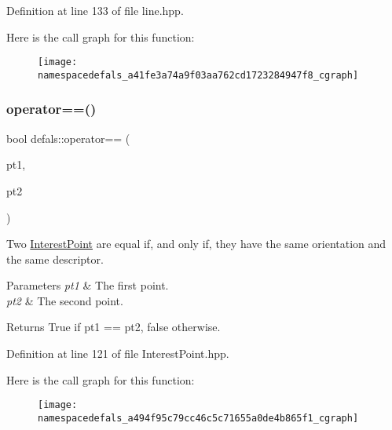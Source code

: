 Definition at line 133 of file line.\+hpp.

Here is the call graph for this function\+:\nopagebreak
\begin{figure}[H]
\begin{center}
\leavevmode
\texttt{[image: namespacedefals\_a41fe3a74a9f03aa762cd1723284947f8\_cgraph]}
\end{center}
\end{figure}
\mbox{\label{namespacedefals_a494f95c79cc46c5c71655a0de4b865f1}} 
\subsubsection{\texorpdfstring{operator==()}{operator==()}\hspace{0.1cm}{\footnotesize\ttfamily [1/2]}}
{\footnotesize\ttfamily bool defals\+::operator== (\begin{DoxyParamCaption}\item[{const \hyperlink{classdefals_1_1_interest_point}{Interest\+Point} \&}]{pt1,  }\item[{const \hyperlink{classdefals_1_1_interest_point}{Interest\+Point} \&}]{pt2 }\end{DoxyParamCaption})\hspace{0.3cm}{\ttfamily [inline]}}

Two \hyperlink{classdefals_1_1_interest_point}{Interest\+Point} are equal if, and only if, they have the same orientation and the same descriptor.


\begin{DoxyParams}{Parameters}
{\em pt1} & The first point. \\
\hline
{\em pt2} & The second point. \\
\hline
\end{DoxyParams}
\begin{DoxyReturn}{Returns}
True if pt1 == pt2, false otherwise. 
\end{DoxyReturn}


Definition at line 121 of file Interest\+Point.\+hpp.

Here is the call graph for this function\+:\nopagebreak
\begin{figure}[H]
\begin{center}
\leavevmode
\texttt{[image: namespacedefals\_a494f95c79cc46c5c71655a0de4b865f1\_cgraph]}
\end{center}
\end{figure}
\mbox{\label{namespacedefals_a4c55b460a9efaca04446cfddd1c947f6}} 
